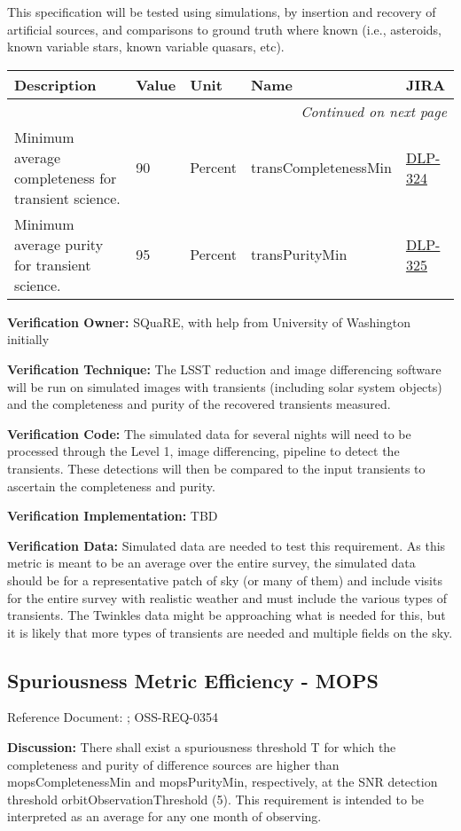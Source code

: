 \documentclass[DM,lsstdraft,toc]{lsstdoc}
\makeatletter
\newcommand{\jira}[1]{\href{https://jira.lsstcorp.org/browse/#1}{#1}}
\newenvironment{metric}[0]{%
\setlength\LTleft{0pt}
\setlength\LTright{\fill}
\begin{longtable}[]{@{}p{0.4\textwidth}lp{0.75in}p{1.3in}p{0.75in}@{}}

\hline \textbf{Description} & \textbf{Value} & \textbf{Unit} & \textbf{Name} & \textbf{JIRA} \\ \hline
\endhead

\hline \multicolumn{5}{r}{\emph{Continued on next page}} \\
\endfoot

\hline\hline
\endlastfoot
}{%
\hline
\end{longtable}
}
\makeatother
\begin{document}
This specification will be tested using simulations, by insertion and
recovery of artificial sources, and comparisons to ground truth where
known (i.e., asteroids, known variable stars, known variable quasars,
etc).

\begin{metric}
Minimum average completeness for transient science. & 90 & Percent &
trans\-Completeness\-Min & \jira{DLP-324}\tabularnewline
Minimum average purity for transient science. & 95 & Percent &
transPurityMin & \jira{DLP-325}\tabularnewline
\end{metric}

\textbf{Verification Owner:} SQuaRE, with help from University of
Washington initially

\textbf{Verification Technique:} The LSST reduction and image
differencing software will be run on simulated images with transients
(including solar system objects) and the completeness and purity of the
recovered transients measured.

\textbf{Verification Code:} The simulated data for several nights will
need to be processed through the Level 1, image differencing, pipeline
to detect the transients. These detections will then be compared to the
input transients to ascertain the completeness and purity.

\textbf{Verification Implementation:} TBD

\textbf{Verification Data:} Simulated data are needed to test this
requirement. As this metric is meant to be an average over the entire
survey, the simulated data should be for a representative patch of sky
(or many of them) and include visits for the entire survey with
realistic weather and must include the various types of transients. The
Twinkles data might be approaching what is needed for this, but it is
likely that more types of transients are needed and multiple fields on
the sky.

\subsection{Spuriousness Metric Efficiency -
MOPS}\label{spuriousness-metric-efficiency---mops}

Reference Document: ; OSS-REQ-0354

\textbf{Discussion:} There shall exist a spuriousness threshold T for
which the completeness and purity of difference sources are higher than
mopsCompletenessMin and mopsPurityMin, respectively, at the SNR
detection threshold orbitObservationThreshold (5). This requirement is
intended to be interpreted as an average for any one month of observing.
\end{document}
